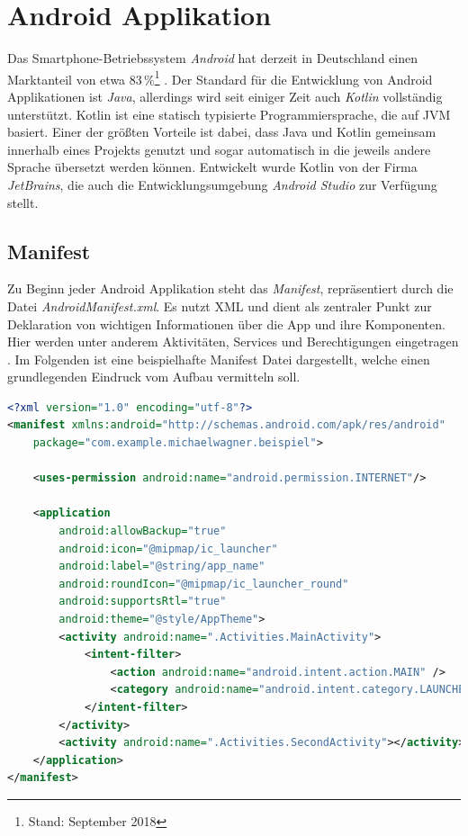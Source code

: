 \newpage
\section{Android Applikation}
\label{sec:basics-android-applikation}

Das Smartphone-Betriebssystem \textit{Android} hat derzeit in Deutschland einen Marktanteil von etwa 83\,\%\footnote{Stand: September 2018} \cite{statistica.com_marktanteile_2018}. Der Standard für die Entwicklung von Android Applikationen ist \textit{Java}, allerdings wird seit einiger Zeit auch \textit{Kotlin} vollständig unterstützt. Kotlin ist eine statisch typisierte Programmiersprache, die auf \ac{JVM} basiert. Einer der größten Vorteile ist dabei, dass Java und Kotlin gemeinsam innerhalb eines Projekts genutzt und sogar automatisch in die jeweils andere Sprache übersetzt werden können. Entwickelt wurde Kotlin von der Firma  \textit{JetBrains}, die auch die Entwicklungsumgebung \textit{Android Studio} zur Verfügung stellt. \cite[S. 272]{prasad_reddy_beginning_2017}

\subsection{Manifest}
\label{subsec:basics-android-manifest}

Zu Beginn jeder Android Applikation steht das \textit{Manifest}, repräsentiert durch die Datei \textit{AndroidManifest.xml}. Es nutzt \ac{XML} und dient als zentraler Punkt zur Deklaration von wichtigen Informationen über die App und ihre Komponenten. Hier werden unter anderem Aktivitäten, Services und Berechtigungen eingetragen \cite[S. 41]{allen_beginning_2015}. Im Folgenden ist eine beispielhafte Manifest Datei dargestellt, welche einen grundlegenden Eindruck vom Aufbau vermitteln soll.
\newline

\begin{lstlisting}[caption={Beispielhafte AndroidManifest.xml Datei}, captionpos=b, label={lst:manifest-xml}, language=XML]
<?xml version="1.0" encoding="utf-8"?>
<manifest xmlns:android="http://schemas.android.com/apk/res/android"
    package="com.example.michaelwagner.beispiel">
    
    <uses-permission android:name="android.permission.INTERNET"/>
    
    <application
        android:allowBackup="true"
        android:icon="@mipmap/ic_launcher"
        android:label="@string/app_name"
        android:roundIcon="@mipmap/ic_launcher_round"
        android:supportsRtl="true"
        android:theme="@style/AppTheme">
        <activity android:name=".Activities.MainActivity">
            <intent-filter>
                <action android:name="android.intent.action.MAIN" />
                <category android:name="android.intent.category.LAUNCHER" />
            </intent-filter>
        </activity>
        <activity android:name=".Activities.SecondActivity"></activity>
    </application>
</manifest>
\end{lstlisting}

